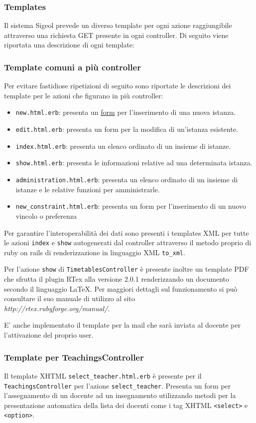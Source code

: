 \documentclass[11pt,a4paper]{article}
\begin{document}
\subsubsection{Templates}
Il sistema Sigeol prevede un diverso template per ogni azione raggiungibile attraverso una richiesta GET presente in ogni controller. Di seguito viene riportata una descrizione di ogni template:
\subsubsection*{Template comuni a più controller}
Per evitare fastidiose ripetizioni di seguito sono riportate le descrizioni dei template per le azioni che figurano in più controller:
\begin{itemize}
 \item \verb|new.html.erb|: presenta un \underline{form} per l'inserimento di una nuova istanza.
 \item \verb|edit.html.erb|: presenta un form per la modifica di un'istanza esistente.
 \item \verb|index.html.erb|: presenta un elenco ordinato di un insieme di istanze.
 \item \verb|show.html.erb|: presenta le informazioni relative ad una determinata istanza.
 \item \verb|administration.html.erb|: presenta un elenco ordinato di un insieme di istanze e le relative funzioni
 per amministrarle.
 \item \verb|new_constraint.html.erb|: presenta un form per l'inserimento di un nuovo vincolo o preferenza
\end{itemize}
Per garantire l'interoperabilità dei dati sono presenti i templates XML per tutte le azioni \verb|index| e \verb|show| autogenerati dal controller attraverso il metodo proprio di ruby on rails di renderizzazione in linguaggio XML \verb|to_xml|.

Per l'azione \verb|show| di \verb|TimetablesController| è presente inoltre un template PDF che sfrutta il plugin RTex alla versione 2.0.1 renderizzando un documento secondo il linguaggio \LaTeX. Per maggiori dettagli sul funzionamento si può consultare il suo manuale di utilizzo al sito \\ \textit{http://rtex.rubyforge.org/manual/}.

E' anche implementato il template per la mail che sarà inviata al docente per l'attivazione del proprio user.
\subsubsection*{Template per TeachingsController}
Il template XHTML \verb|select_teacher.html.erb| è presente per il \\ \verb|TeachingsController| per l'azione \verb|select_teacher|.  Presenta un form per l'assegnamento di un docente ad un insegnamento utilizzando metodi per la presentazione automatica della lista dei docenti come i tag XHTML \verb|<select>| e \verb|<option>|.
\end{document}
